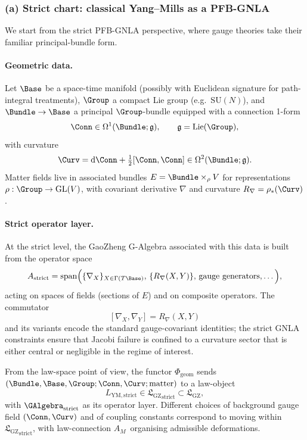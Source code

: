 \documentclass[11pt]{book}
\theoremstyle{plain}
\theoremstyle{definition}
\newcommand{\GZLS}{\ensuremath{\mathfrak{L}_{\mathrm{GZ}}}}       \newcommand{\GZLT}{\ensuremath{M_{!w}}}                           \newcommand{\GZLOC}{\ensuremath{A_M}}                             \newcommand{\GZLCurv}{\ensuremath{\mathcal{F}_{\mathrm{law}}}}
\begin{document}
\subsubsection*{(a) Strict chart: classical Yang--Mills as a PFB-GNLA}

We start from the strict PFB-GNLA perspective, where gauge theories
take their familiar principal-bundle form.

\paragraph{Geometric data.}

Let $\Base$ be a space-time manifold (possibly with Euclidean signature
for path-integral treatments), $\Group$ a compact Lie group (e.g.\
$\mathrm{SU}(N)$), and $\Bundle\to\Base$ a principal $\Group$-bundle
equipped with a connection 1-form
\[
  \Conn \in \Omega^1(\Bundle;\mathfrak{g}),
  \qquad \mathfrak{g}=\mathrm{Lie}(\Group),
\]
with curvature
\[
  \Curv
  = \mathrm{d}\Conn + \tfrac12[\Conn,\Conn]
  \in \Omega^2(\Bundle;\mathfrak{g}).
\]
Matter fields live in associated bundles $E=\Bundle\times_\rho V$ for
representations $\rho:\Group\to\mathrm{GL}(V)$, with covariant
derivative $\nabla$ and curvature $R_\nabla=\rho_*(\Curv)$.

\paragraph{Strict operator layer.}

At the strict level, the GaoZheng G-Algebra associated with this data
is built from the operator space
\[
  A_{\mathrm{strict}}
  =
  \mathrm{span}\Bigl(
    \{\nabla_X\}_{X\in\Gamma(T\Base)},\,
    \{R_\nabla(X,Y)\},\,
    \text{gauge generators},\dots
  \Bigr),
\]
acting on spaces of fields (sections of $E$) and on composite operators.
The commutator
\[
  [\nabla_X,\nabla_Y]
  =
  R_\nabla(X,Y)
\]
and its variants encode the standard gauge-covariant identities; the
strict GNLA constraints ensure that Jacobi failure is confined to a
curvature sector that is either central or negligible in the regime of
interest.

From the law-space point of view, the functor $\Phi_{\mathrm{geom}}$
sends $(\Bundle,\Base,\Group;\Conn,\Curv;\text{matter})$ to a law-object
\[
  L_{\mathrm{YM,strict}}
  \in {\GZLS}_{\mathrm{strict}}\subset\GZLS,
\]
with $\GAlgebra_{\mathrm{strict}}$ as its operator layer. Different
choices of background gauge field $(\Conn,\Curv)$ and of coupling
constants correspond to moving within ${\GZLS}_{\mathrm{strict}}$, with
law-connection \GZLOC\ organising admissible deformations.
\end{document}
